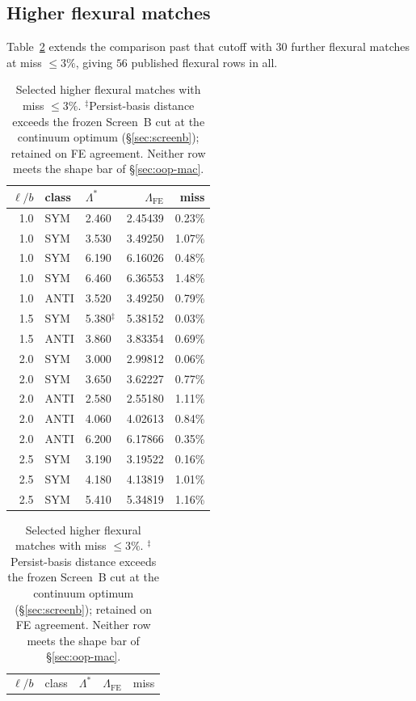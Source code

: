 \documentclass[11pt]{article}
\begin{document}
\subsection{Higher flexural matches}\label{sec:oop-high}
Table~\ref{tab:oop-high} extends the comparison past that cutoff with $30$ further flexural matches at miss $\le 3\%$, giving $56$ published flexural rows in all.
\begin{table}[!htbp]\centering\footnotesize
\caption{Selected higher flexural matches with miss $\le 3\%$.
$^\ddagger$Persist-basis distance exceeds the frozen Screen~B cut at the
continuum optimum (\S\ref{sec:screenb}); retained on FE agreement.
Neither row meets the shape bar of \S\ref{sec:oop-mac}.}
\label{tab:oop-high}
\setlength{\tabcolsep}{5pt}
\noindent\begin{minipage}[t]{0.49\textwidth}
\begin{tabular}{@{}rllrr@{}}
\toprule
$\ell/b$ & class & $\Lambda^{*}$ & $\Lambda_{\mathrm{FE}}$ & miss \\
\midrule
1.0 & SYM  & 2.460 & 2.45439 & 0.23\% \\
1.0 & SYM  & 3.530 & 3.49250 & 1.07\% \\
1.0 & SYM  & 6.190 & 6.16026 & 0.48\% \\
1.0 & SYM  & 6.460 & 6.36553 & 1.48\% \\
1.0 & ANTI & 3.520 & 3.49250 & 0.79\% \\
1.5 & SYM  & 5.380$^\ddagger$ & 5.38152 & 0.03\% \\
1.5 & ANTI & 3.860 & 3.83354 & 0.69\% \\
2.0 & SYM  & 3.000 & 2.99812 & 0.06\% \\
2.0 & SYM  & 3.650 & 3.62227 & 0.77\% \\
2.0 & ANTI & 2.580 & 2.55180 & 1.11\% \\
2.0 & ANTI & 4.060 & 4.02613 & 0.84\% \\
2.0 & ANTI & 6.200 & 6.17866 & 0.35\% \\
2.5 & SYM  & 3.190 & 3.19522 & 0.16\% \\
2.5 & SYM  & 4.180 & 4.13819 & 1.01\% \\
2.5 & SYM  & 5.410 & 5.34819 & 1.16\% \\
\bottomrule
\end{tabular}
\end{minipage}\hfill
\begin{minipage}[t]{0.49\textwidth}
\begin{tabular}{@{}rllrr@{}}
\toprule
$\ell/b$ & class & $\Lambda^{*}$ & $\Lambda_{\mathrm{FE}}$ & miss \\

\end{tabular}
\end{minipage}
\end{table}
\end{document}
